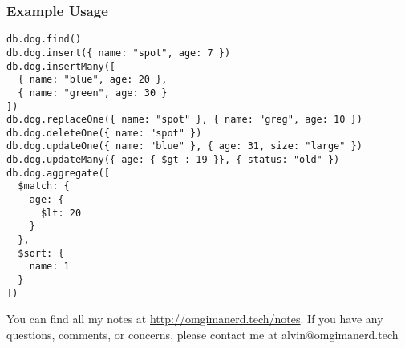 \documentclass{math}
\begin{document}
\subsubsection*{Example Usage}
\begin{lstlisting}
db.dog.find()
db.dog.insert({ name: "spot", age: 7 })
db.dog.insertMany([
  { name: "blue", age: 20 },
  { name: "green", age: 30 }
])
db.dog.replaceOne({ name: "spot" }, { name: "greg", age: 10 })
db.dog.deleteOne({ name: "spot" })
db.dog.updateOne({ name: "blue" }, { age: 31, size: "large" })
db.dog.updateMany({ age: { $gt : 19 }}, { status: "old" })
db.dog.aggregate([
  $match: {
    age: {
      $lt: 20
    }
  },
  $sort: {
    name: 1
  }
])
\end{lstlisting}

\begin{center}
  You can find all my notes at \url{http://omgimanerd.tech/notes}. If you have
  any questions, comments, or concerns, please contact me at
  alvin@omgimanerd.tech
\end{center}
\end{document}
